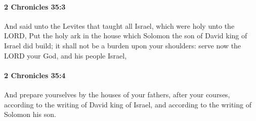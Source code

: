 		\paragraph{2 Chronicles 35:3} %
			\label{2CHRONICLES-35-3}

			And said unto the Levites that taught all Israel, which were holy unto the LORD, Put the holy ark in the house which Solomon the son of David king of Israel did build; it shall not be a burden upon your shoulders: serve now the LORD your God, and his people Israel,


		\paragraph{2 Chronicles 35:4} %
			\label{2CHRONICLES-35-4}

			And prepare yourselves by the houses of your fathers, after your courses, according to the writing of David king of Israel, and according to the writing of Solomon his son.

